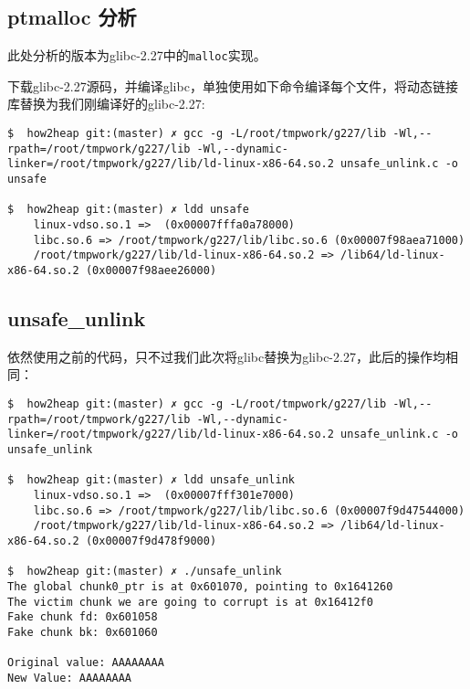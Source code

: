 \begin{center}
    \section{ptmalloc 分析}
\end{center}

\setlength{\parindent}{2em}
此处分析的版本为glibc-2.27中的\verb+malloc+实现。

下载glibc-2.27源码，并编译glibc，单独使用如下命令编译每个文件，将动态链接库替换为我们刚编译好的glibc-2.27:
\begin{verbatim}
$  how2heap git:(master) ✗ gcc -g -L/root/tmpwork/g227/lib -Wl,--rpath=/root/tmpwork/g227/lib -Wl,--dynamic-linker=/root/tmpwork/g227/lib/ld-linux-x86-64.so.2 unsafe_unlink.c -o unsafe 

$  how2heap git:(master) ✗ ldd unsafe 
    linux-vdso.so.1 =>  (0x00007fffa0a78000)
    libc.so.6 => /root/tmpwork/g227/lib/libc.so.6 (0x00007f98aea71000)
    /root/tmpwork/g227/lib/ld-linux-x86-64.so.2 => /lib64/ld-linux-x86-64.so.2 (0x00007f98aee26000)
\end{verbatim}

\subsection{unsafe\_unlink}
依然使用之前的代码，只不过我们此次将glibc替换为glibc-2.27，此后的操作均相同：
\begin{verbatim}
$  how2heap git:(master) ✗ gcc -g -L/root/tmpwork/g227/lib -Wl,--rpath=/root/tmpwork/g227/lib -Wl,--dynamic-linker=/root/tmpwork/g227/lib/ld-linux-x86-64.so.2 unsafe_unlink.c -o unsafe_unlink

$  how2heap git:(master) ✗ ldd unsafe_unlink 
    linux-vdso.so.1 =>  (0x00007fff301e7000)
    libc.so.6 => /root/tmpwork/g227/lib/libc.so.6 (0x00007f9d47544000)
    /root/tmpwork/g227/lib/ld-linux-x86-64.so.2 => /lib64/ld-linux-x86-64.so.2 (0x00007f9d478f9000)

$  how2heap git:(master) ✗ ./unsafe_unlink 
The global chunk0_ptr is at 0x601070, pointing to 0x1641260
The victim chunk we are going to corrupt is at 0x16412f0
Fake chunk fd: 0x601058
Fake chunk bk: 0x601060

Original value: AAAAAAAA
New Value: AAAAAAAA
\end{verbatim}

